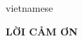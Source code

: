 \begin{titlepage}
\begin{otherlanguage*}{vietnamese}

\begin{center}
    \fontsize{18}{18}\textbf{LỜI CẢM ƠN}
\end{center}

\end{otherlanguage*}
\vfill
\end{titlepage}